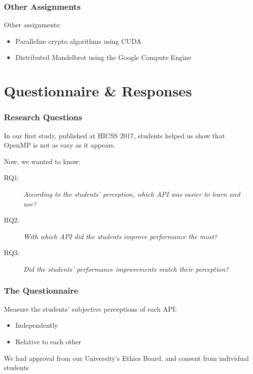 \documentclass[10pt, compress, aspectratio=169]{beamer}
\begin{document}
\begin{frame}
    \frametitle{Other Assignments}
    Other assignments:

    \begin{itemize}
        \item Parallelize crypto algorithms using CUDA
        \item Distributed Mandelbrot using the Google Compute Engine
    \end{itemize}
\end{frame}

\section{Questionnaire \& Responses}

\begin{frame}
    \frametitle{Research Questions}
    In our first study, published at HICSS 2017, students helped us show that
    OpenMP is not as easy as it appears.

    \pause

    Now, we wanted to know:

    \begin{description}
        \item[RQ1:] \textit{According to the students' perception, which API was
            easier to learn and use?}
        \item[RQ2:] \textit{With which API did the students improve performance the
            most?}
        \item[RQ3:] \textit{Did the students' performance improvements match their
            perception?}
    \end{description}
\end{frame}

\begin{frame}
    \frametitle{The Questionnaire}
    Measure the students' subjective perceptions of each API:

    \begin{itemize}
        \item Independently
        \item Relative to each other
    \end{itemize}

    \pause

    We had approval from our University's Ethics Board, and consent from
    individual students
\end{frame}
\end{document}
